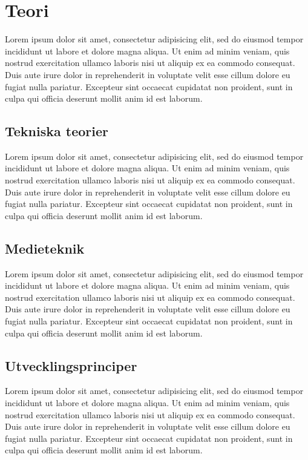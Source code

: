 \documentclass[a4paper,12pt,oneside,final]{extbook}
\begin{document}
\section{Teori}

Lorem ipsum dolor sit amet, consectetur adipisicing elit, sed do eiusmod tempor incididunt ut labore et dolore magna aliqua. Ut enim ad minim veniam, quis nostrud exercitation ullamco laboris nisi ut aliquip ex ea commodo consequat. Duis aute irure dolor in reprehenderit in voluptate velit esse cillum dolore eu fugiat nulla pariatur. Excepteur sint occaecat cupidatat non proident, sunt in culpa qui officia deserunt mollit anim id est laborum.

\subsection{Tekniska teorier}

Lorem ipsum dolor sit amet, consectetur adipisicing elit, sed do eiusmod tempor incididunt ut labore et dolore magna aliqua. Ut enim ad minim veniam, quis nostrud exercitation ullamco laboris nisi ut aliquip ex ea commodo consequat. Duis aute irure dolor in reprehenderit in voluptate velit esse cillum dolore eu fugiat nulla pariatur. Excepteur sint occaecat cupidatat non proident, sunt in culpa qui officia deserunt mollit anim id est laborum.

\subsection{Medieteknik}

Lorem ipsum dolor sit amet, consectetur adipisicing elit, sed do eiusmod tempor incididunt ut labore et dolore magna aliqua. Ut enim ad minim veniam, quis nostrud exercitation ullamco laboris nisi ut aliquip ex ea commodo consequat. Duis aute irure dolor in reprehenderit in voluptate velit esse cillum dolore eu fugiat nulla pariatur. Excepteur sint occaecat cupidatat non proident, sunt in culpa qui officia deserunt mollit anim id est laborum.

\subsection{Utvecklingsprinciper}

Lorem ipsum dolor sit amet, consectetur adipisicing elit, sed do eiusmod tempor incididunt ut labore et dolore magna aliqua. Ut enim ad minim veniam, quis nostrud exercitation ullamco laboris nisi ut aliquip ex ea commodo consequat. Duis aute irure dolor in reprehenderit in voluptate velit esse cillum dolore eu fugiat nulla pariatur. Excepteur sint occaecat cupidatat non proident, sunt in culpa qui officia deserunt mollit anim id est laborum.
\end{document}
